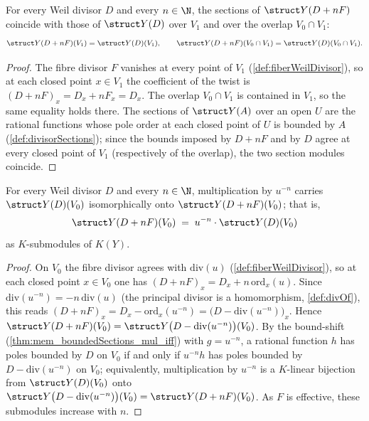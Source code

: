 \begin{theorem}
  \label{thm:divisorSections_twist_fixed}
  \leanok
  For every Weil divisor \(D\) and every \(n \in \N\), the sections of \(\struct Y(D + nF)\)
  coincide with those of \(\struct Y(D)\) over \(V_1\) and over the overlap \(V_0 \cap V_1\):
  \[
    \struct Y(D + nF)(V_1) = \struct Y(D)(V_1), \qquad
    \struct Y(D + nF)(V_0 \cap V_1) = \struct Y(D)(V_0 \cap V_1).
  \]
\end{theorem}
\begin{proof}
  \leanok
  The fibre divisor \(F\) vanishes at every point of \(V_1\) (\ref{def:fiberWeilDivisor}), so at each
  closed point \(x \in V_1\) the coefficient of the twist is \((D + nF)_x = D_x + n F_x = D_x\). The
  overlap \(V_0 \cap V_1\) is contained in \(V_1\), so the same equality holds there. The sections of
  \(\struct Y(A)\) over an open \(U\) are the rational functions whose pole order at each closed point
  of \(U\) is bounded by \(A\) (\ref{def:divisorSections}); since the bounds imposed by \(D + nF\) and
  by \(D\) agree at every closed point of \(V_1\) (respectively of the overlap), the two section
  modules coincide.
\end{proof}

\begin{theorem}
  \label{thm:divisorSections_twist_chart0}
  \leanok
  For every Weil divisor \(D\) and every \(n \in \N\), multiplication by \(u^{-n}\) carries
  \(\struct Y(D)(V_0)\) isomorphically onto \(\struct Y(D + nF)(V_0)\); that is,
  \[
    \struct Y(D + nF)(V_0) \;=\; u^{-n}\cdot \struct Y(D)(V_0)
  \]
  as \(K\)-submodules of \(K(Y)\).
\end{theorem}
\begin{proof}
  \leanok
  On \(V_0\) the fibre divisor agrees with \(\mathrm{div}(u)\) (\ref{def:fiberWeilDivisor}), so at
  each closed point \(x \in V_0\) one has \((D + nF)_x = D_x + n\,\mathrm{ord}_x(u)\). Since
  \(\mathrm{div}(u^{-n}) = -n\,\mathrm{div}(u)\) (the principal divisor is a homomorphism,
  \ref{def:divOf}), this reads \((D + nF)_x = D_x - \mathrm{ord}_x(u^{-n}) = \bigl(D -
  \mathrm{div}(u^{-n})\bigr)_x\). Hence \(\struct Y(D + nF)(V_0) = \struct Y\bigl(D -
  \mathrm{div}(u^{-n})\bigr)(V_0)\). By the bound-shift (\ref{thm:mem_boundedSections_mul_iff}) with
  \(g = u^{-n}\), a rational function \(h\) has poles bounded by \(D\) on \(V_0\) if and only if
  \(u^{-n} h\) has poles bounded by \(D - \mathrm{div}(u^{-n})\) on \(V_0\); equivalently,
  multiplication by \(u^{-n}\) is a \(K\)-linear bijection from \(\struct Y(D)(V_0)\) onto
  \(\struct Y\bigl(D - \mathrm{div}(u^{-n})\bigr)(V_0) = \struct Y(D + nF)(V_0)\). As \(F\) is
  effective, these submodules increase with \(n\).
\end{proof}


